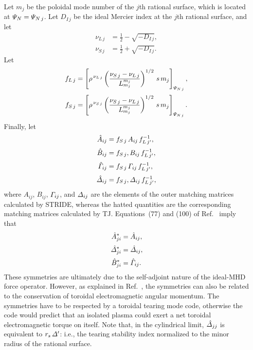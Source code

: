 \documentclass[12pt,prb,aps,notitlepage]{revtex4-1}
\begin{document}
Let $m_j$ be the poloidal mode number of the $j$th rational surface, which is located at ${\mit\Psi}_N= {\mit\Psi}_{N\,j}$. Let $D_{I\,j}$ be the ideal
Mercier index at the $j$th rational surface, and
let
\begin{align}
\nu_{L\,j} &=\frac{1}{2}-\sqrt{-D_{I\,j}},\\[0.5ex]
\nu_{S\,j} &=\frac{1}{2}+\sqrt{-D_{I\,j}}.
\end{align}
Let
\begin{align}
f_{L\,j} &= \left[\rho^{\,\nu_{L\,j}}
\left(\frac{\nu_{S\,j}-\nu_{L\,j}}{L_{m_j}^{m_j}}\right)^{1/2}\,s\,m_j
\right]_{{\mit\Psi}_{N\,j}},\\[0.5ex]
f_{S\,j} &= \left[\rho^{\,\nu_{S\,j}}
\left(\frac{\nu_{S\,j}-\nu_{L\,j}}{L_{m_j}^{m_j}}\right)^{1/2}\,s\,m_j
\right]_{{\mit\Psi}_{N\,j}}.
\end{align}
Finally, let
\begin{align}
\hat{A}_{ij}&= f_{S\,j}\,A_{ij}\,f_{L\,j'}^{-1},\\[0.5ex]
\hat{B}_{ij}&= f_{S\,j},B_{ij}\,f_{L\,j'}^{-1},\\[0.5ex]
\hat{\mit\Gamma}_{ij}&= f_{S\,j}\,{\mit\Gamma}_{ij}\,f_{L\,j'}^{-1},\\[0.5ex]
\hat{\mit\Delta}_{ij}&= f_{S\,j},{\mit\Delta}_{ij}\,f_{L\,j'}^{-1},
\end{align}
where $A_{ij}$, $B_{ij}$, ${\mit\Gamma}_{ij}$, and ${\mit\Delta}_{ij}$ are the elements of the outer matching matrices
calculated by STRIDE, whereas the hatted quantities are the  corresponding matching matrices calculated by TJ. 
Equations~(77) and (100) of Ref.~ imply that
\begin{align}
\hat{A}_{ji}^\ast &= \hat{A}_{ij},\\[0.5ex]
\hat{\mit\Delta}_{ji}^\ast &= \hat{\mit\Delta}_{ij},\label{sym}\\[0.5ex]
\hat{B}_{ji}^\ast &= \hat{\mit\Gamma}_{ij}.
\end{align}
These symmetries are ultimately due to the self-adjoint nature of the ideal-MHD force operator. However, as explained
in Ref.~, the symmetries can also be related to the conservation of toroidal electromagnetic angular momentum. The
symmetries have to be respected by a toroidal tearing mode code, otherwise the code would predict that an isolated 
plasma could exert a net toroidal electromagnetic torque on itself. Note that, in the cylindrical limit, $\hat{\mit\Delta}_{jj}$ is equivalent to $r_s\,{\mit\Delta}'$: i.e.,
the tearing stability index normalized to the minor radius of the rational surface. 
\end{document}
